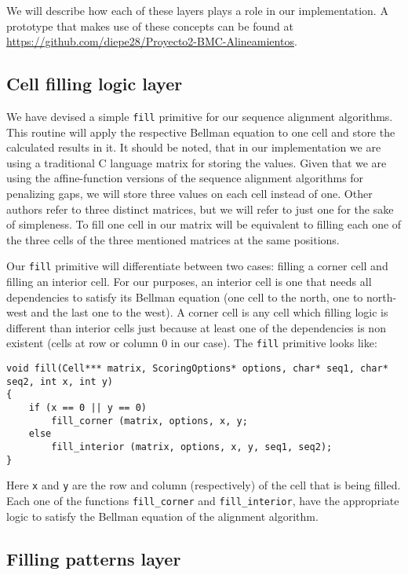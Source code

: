 \documentclass[journal]{IEEEtran}
\begin{document}
We will describe how each of these layers plays a role in our implementation. A prototype that makes use of these concepts can be found at \url{https://github.com/diepe28/Proyecto2-BMC-Alineamientos}.

\subsection{Cell filling logic layer}

We have devised a simple {\tt fill} primitive for our sequence alignment algorithms. This routine will apply the respective Bellman equation to one cell and store the calculated results in it. It should be noted, that in our implementation we are using a traditional C language matrix for storing the values. Given that we are using the affine-function versions of the sequence alignment algorithms for penalizing gaps, we will store three values on each cell instead of one. Other authors refer to three distinct matrices, but we will refer to just one for the sake of simpleness. To fill one cell in our matrix will be equivalent to filling each one of the three cells of the three mentioned matrices at the same positions.

Our {\tt fill} primitive will differentiate between two cases: filling a corner cell and filling an interior cell. For our purposes, an interior cell is one that needs all dependencies to satisfy its Bellman equation (one cell to the north, one to north-west and the last one to the west). A corner cell is any cell which filling logic is different than interior cells just because at least one of the dependencies is non existent (cells at row or column $0$ in our case). The  {\tt fill} primitive looks like:


\lstset{language=C}
\begin{lstlisting}[linewidth=\columnwidth,breaklines=true]
void fill(Cell*** matrix, ScoringOptions* options, char* seq1, char* seq2, int x, int y) 
{
	if (x == 0 || y == 0)
		fill_corner (matrix, options, x, y;
	else
		fill_interior (matrix, options, x, y, seq1, seq2);
}
\end{lstlisting}

Here {\tt x} and {\tt y} are the row and column (respectively) of the cell that is being filled. Each one of the functions {\tt fill\_corner} and {\tt fill\_interior}, have the appropriate logic to satisfy the Bellman equation of the alignment algorithm. 

\subsection{Filling patterns layer}
\end{document}
